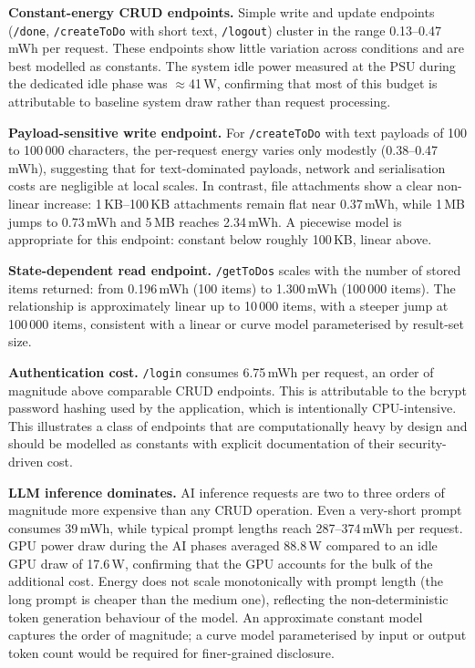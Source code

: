 \textbf{Constant-energy CRUD endpoints.} Simple write and update endpoints (\texttt{/done}, \texttt{/createToDo} with short text, \texttt{/logout}) cluster in the range 0.13--0.47\,mWh per request. These endpoints show little variation across conditions and are best modelled as constants. The system idle power measured at the PSU during the dedicated idle phase was $\approx$41\,W, confirming that most of this budget is attributable to baseline system draw rather than request processing.

\textbf{Payload-sensitive write endpoint.} For \texttt{/createToDo} with text payloads of 100 to 100\,000 characters, the per-request energy varies only modestly (0.38--0.47\,mWh), suggesting that for text-dominated payloads, network and serialisation costs are negligible at local scales. In contrast, file attachments show a clear non-linear increase: 1\,KB--100\,KB attachments remain flat near 0.37\,mWh, while 1\,MB jumps to 0.73\,mWh and 5\,MB reaches 2.34\,mWh. A piecewise model is appropriate for this endpoint: constant below roughly 100\,KB, linear above.

\textbf{State-dependent read endpoint.} \texttt{/getToDos} scales with the number of stored items returned: from 0.196\,mWh (100 items) to 1.300\,mWh (100\,000 items). The relationship is approximately linear up to 10\,000 items, with a steeper jump at 100\,000 items, consistent with a linear or curve model parameterised by result-set size.

\textbf{Authentication cost.} \texttt{/login} consumes 6.75\,mWh per request, an order of magnitude above comparable CRUD endpoints. This is attributable to the bcrypt password hashing used by the application, which is intentionally CPU-intensive. This illustrates a class of endpoints that are computationally heavy by design and should be modelled as constants with explicit documentation of their security-driven cost.

\textbf{LLM inference dominates.} AI inference requests are two to three orders of magnitude more expensive than any CRUD operation. Even a very-short prompt consumes 39\,mWh, while typical prompt lengths reach 287--374\,mWh per request. GPU power draw during the AI phases averaged 88.8\,W compared to an idle GPU draw of 17.6\,W, confirming that the GPU accounts for the bulk of the additional cost. Energy does not scale monotonically with prompt length (the long prompt is cheaper than the medium one), reflecting the non-deterministic token generation behaviour of the model. An approximate constant model captures the order of magnitude; a curve model parameterised by input or output token count would be required for finer-grained disclosure.

